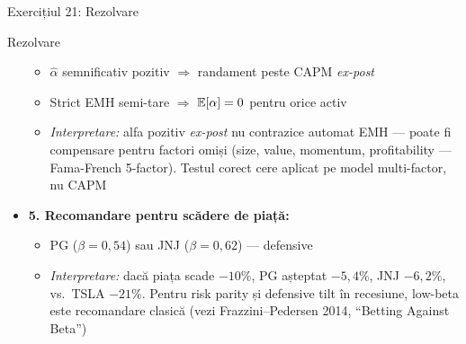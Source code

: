 \documentclass[9pt, aspectratio=169, t]{beamer}
\begin{document}
\begin{frame}[shrink=35]{Exercițiul 21: Rezolvare}
\begin{cminipage}{0.95\textwidth}
\begin{exampleblock}{Rezolvare}
\begin{itemize}
    \begin{itemize}\setlength{\itemsep}{0pt}
        \item $\hat\alpha$ semnificativ pozitiv $\Rightarrow$ randament peste CAPM \emph{ex-post}
        \item Strict EMH semi-tare $\Rightarrow$ $\E[\alpha] = 0$ pentru orice activ
        \item \textit{Interpretare:} alfa pozitiv \emph{ex-post} nu contrazice automat EMH --- poate fi compensare pentru factori omiși (size, value, momentum, profitability — Fama-French 5-factor). Testul corect cere aplicat pe model multi-factor, nu CAPM
    \end{itemize}
    \item \textbf{5. Recomandare pentru scădere de piață:}
    \begin{itemize}\setlength{\itemsep}{0pt}
        \item PG ($\beta = 0{,}54$) sau JNJ ($\beta = 0{,}62$) --- defensive
        \item \textit{Interpretare:} dacă piața scade $-10\%$, PG așteptat $-5{,}4\%$, JNJ $-6{,}2\%$, vs.\ TSLA $-21\%$. Pentru risk parity și defensive tilt în recesiune, low-beta este recomandare clasică (vezi Frazzini--Pedersen 2014, ``Betting Against Beta'')
    \end{itemize}
\end{itemize}
\end{exampleblock}
\end{cminipage}
\end{frame}

\end{document}
